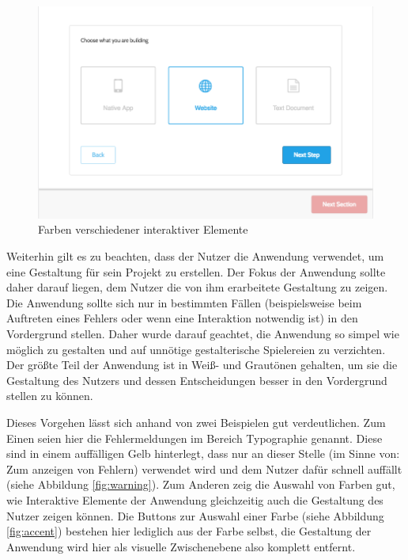 \begin{figure}[h]
    \centering
    \includegraphics[width=1\textwidth]{images/25knots_entrance.png}
    \caption{Farben verschiedener interaktiver Elemente}
    \label{fig:entrance}
\end{figure}

Weiterhin gilt es zu beachten, dass der Nutzer die Anwendung verwendet, um eine Gestaltung für sein Projekt zu erstellen. Der Fokus der Anwendung sollte daher darauf liegen, dem Nutzer die von ihm erarbeitete Gestaltung zu zeigen. Die Anwendung sollte sich nur in bestimmten Fällen (beispielsweise beim Auftreten eines Fehlers oder wenn eine Interaktion notwendig ist) in den Vordergrund stellen. Daher wurde darauf geachtet, die Anwendung so simpel wie möglich zu gestalten und auf unnötige gestalterische Spielereien zu verzichten. Der größte Teil der Anwendung ist in Weiß- und Grautönen gehalten, um sie die Gestaltung des Nutzers und dessen Entscheidungen besser in den Vordergrund stellen zu können.

Dieses Vorgehen lässt sich anhand von zwei Beispielen gut verdeutlichen. Zum Einen seien hier die Fehlermeldungen im Bereich Typographie genannt. Diese sind in einem auffälligen Gelb hinterlegt, dass nur an dieser Stelle (im Sinne von: Zum anzeigen von Fehlern) verwendet wird und dem Nutzer dafür schnell auffällt (siehe Abbildung \ref{fig:warning}).
Zum Anderen zeig die Auswahl von Farben gut, wie Interaktive Elemente der Anwendung gleichzeitig auch die Gestaltung des Nutzer zeigen können. Die Buttons zur Auswahl einer Farbe (siehe Abbildung \ref{fig:accent}) bestehen hier lediglich aus der Farbe selbst, die Gestaltung der Anwendung wird hier als visuelle Zwischenebene also komplett entfernt.

